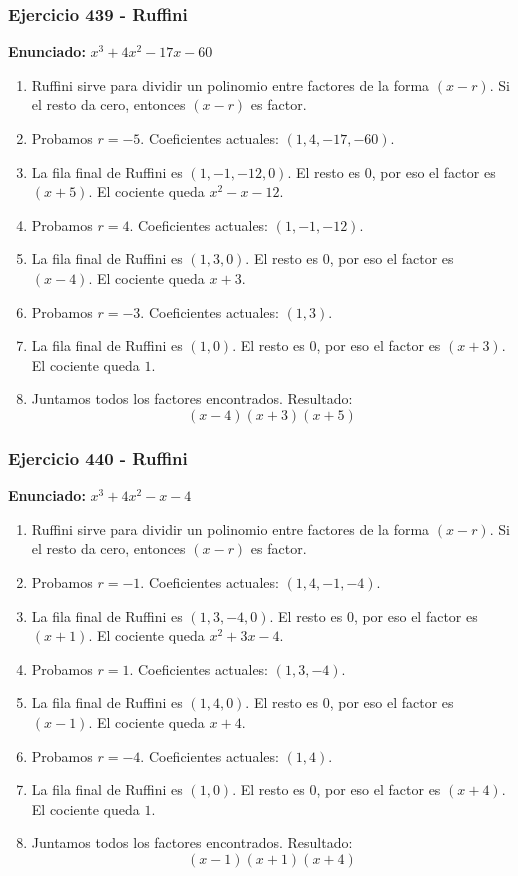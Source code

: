 \documentclass[11pt,a4paper]{article}
\begin{document}
\vspace{0.2cm}
\subsubsection*{Ejercicio 439 - Ruffini}
\textbf{Enunciado:} $ x^{3} + 4 x^{2} - 17 x - 60 $\par
\begin{enumerate}[leftmargin=2em]
\item Ruffini sirve para dividir un polinomio entre factores de la forma \((x-r)\). Si el resto da cero, entonces \((x-r)\) es factor.
\item Probamos \(r=-5\). Coeficientes actuales: \((1, 4, -17, -60)\).
\item La fila final de Ruffini es \((1, -1, -12, 0)\). El resto es \(0\), por eso el factor es \((x+5)\). El cociente queda \(x^{2} - x - 12\).
\item Probamos \(r=4\). Coeficientes actuales: \((1, -1, -12)\).
\item La fila final de Ruffini es \((1, 3, 0)\). El resto es \(0\), por eso el factor es \((x-4)\). El cociente queda \(x + 3\).
\item Probamos \(r=-3\). Coeficientes actuales: \((1, 3)\).
\item La fila final de Ruffini es \((1, 0)\). El resto es \(0\), por eso el factor es \((x+3)\). El cociente queda \(1\).
\item Juntamos todos los factores encontrados. Resultado: \[\boxed{\left(x - 4\right) \left(x + 3\right) \left(x + 5\right)}\]
\end{enumerate}

\vspace{0.2cm}
\subsubsection*{Ejercicio 440 - Ruffini}
\textbf{Enunciado:} $ x^{3} + 4 x^{2} - x - 4 $\par
\begin{enumerate}[leftmargin=2em]
\item Ruffini sirve para dividir un polinomio entre factores de la forma \((x-r)\). Si el resto da cero, entonces \((x-r)\) es factor.
\item Probamos \(r=-1\). Coeficientes actuales: \((1, 4, -1, -4)\).
\item La fila final de Ruffini es \((1, 3, -4, 0)\). El resto es \(0\), por eso el factor es \((x+1)\). El cociente queda \(x^{2} + 3 x - 4\).
\item Probamos \(r=1\). Coeficientes actuales: \((1, 3, -4)\).
\item La fila final de Ruffini es \((1, 4, 0)\). El resto es \(0\), por eso el factor es \((x-1)\). El cociente queda \(x + 4\).
\item Probamos \(r=-4\). Coeficientes actuales: \((1, 4)\).
\item La fila final de Ruffini es \((1, 0)\). El resto es \(0\), por eso el factor es \((x+4)\). El cociente queda \(1\).
\item Juntamos todos los factores encontrados. Resultado: \[\boxed{\left(x - 1\right) \left(x + 1\right) \left(x + 4\right)}\]
\end{enumerate}
\end{document}
